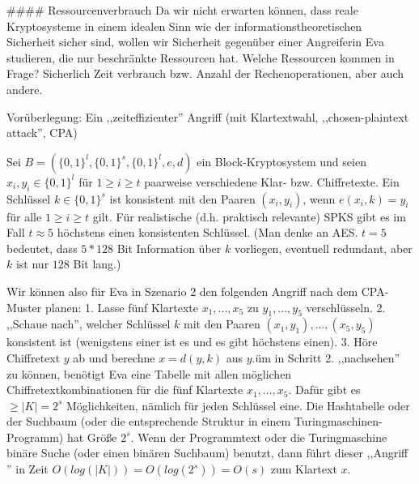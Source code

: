 \documentclass[a4paper]{article}
\begin{document}
\begin{multicols}{3}
#### Ressourcenverbrauch
Da wir nicht erwarten können, dass reale Kryptosysteme in einem idealen Sinn wie der informationstheoretischen Sicherheit sicher sind, wollen wir Sicherheit gegenüber einer Angreiferin Eva studieren, die nur beschränkte Ressourcen hat. Welche Ressourcen kommen in Frage? Sicherlich Zeit verbrauch bzw. Anzahl der Rechenoperationen, aber auch andere.

Vorüberlegung: Ein ,,zeiteffizienter'' Angriff (mit Klartextwahl, ,,chosen-plaintext attack'', CPA)

Sei $B=(\{0,1\}^l,\{0,1\}^s,\{0,1\}^l,e,d)$ ein Block-Kryptosystem und seien $x_i,y_i\in\{0,1\}^l$ für $1\geq i\geq t$ paarweise verschiedene Klar- bzw. Chiffretexte. Ein Schlüssel $k\in\{0,1\}^s$ ist konsistent mit den Paaren $(x_i,y_i)$, wenn $e(x_i,k)=y_i$ für alle $1\geq i\geq t$ gilt. Für realistische (d.h. praktisch relevante) SPKS gibt es im Fall $t\approx 5$ höchstens einen konsistenten Schlüssel. (Man denke an AES. $t=5$ bedeutet, dass $5*128$ Bit Information über $k$ vorliegen, eventuell redundant, aber $k$ ist nur $128$ Bit lang.)

Wir können also für Eva in Szenario 2 den folgenden Angriff nach dem CPA-Muster planen:
1. Lasse fünf Klartexte $x_1,...,x_5$ zu $y_1,...,y_5$ verschlüsseln.
2. ,,Schaue nach'', welcher Schlüssel $k$ mit den Paaren $(x_1,y_1),...,(x_5,y_5)$ konsistent ist (wenigstens einer ist es und es gibt höchstens einen).
3. Höre Chiffretext $y$ ab und berechne $x=d(y,k)$ aus $y$.üm in Schritt 2. ,,nachsehen'' zu können, benötigt Eva eine Tabelle mit allen möglichen Chiffretextkombinationen für die fünf Klartexte $x_1,...,x_5$. Dafür gibt es $\geq |K|= 2^s$ Möglichkeiten, nämlich für jeden Schlüssel eine. Die Hashtabelle oder der Suchbaum (oder die entsprechende Struktur in einem Turingmaschinen-Programm) hat Größe $2^s$. Wenn der Programmtext oder die Turingmaschine binäre Suche (oder einen binären Suchbaum) benutzt, dann führt dieser ,,Angriff '' in Zeit $O(log(|K|)) =O(log(2^s)) =O(s)$ zum Klartext $x$.


\end{multicols}
\end{document}
